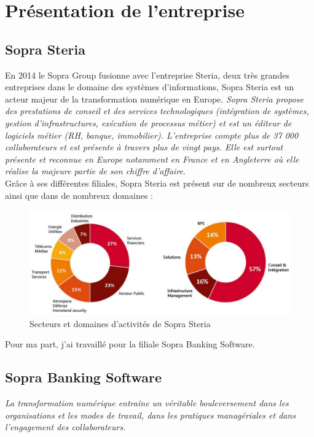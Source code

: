 \section{Présentation de l'entreprise}
\subsection{Sopra Steria}
En 2014 le Sopra Group fusionne avec l'entreprise Steria, deux très grandes entreprises dans le domaine des systèmes d'informations, Sopra Steria est un acteur majeur de la transformation numérique en Europe.
\textit{ Sopra Steria propose des prestations de conseil et des services technologiques (intégration de systèmes, gestion d’infrastructures, exécution de processus métier) et est un éditeur de logiciels métier (RH, banque, immobilier). L'entreprise compte plus de 37 000 collaborateurs et est présente à travers plus de vingt pays. Elle est surtout présente et reconnue en Europe notamment en France et en Angleterre où elle réalise la majeure partie de son chiffre d'affaire}.\\

Grâce à ses différentes filiales, Sopra Steria est présent sur de nombreux secteurs ainsi que dans de nombreux domaines :\\
\begin{figure}[h]
\centering
\includegraphics[scale=0.6]{resources/sopraSteriaGraph.png}
\caption{Secteurs et domaines d'activités de Sopra Steria}
\label{sopraSteriaGraph}
\end{figure}

Pour ma part, j'ai travaillé pour la filiale Sopra Banking Software.

\newpage
\subsection{Sopra Banking Software}
\textit{La transformation numérique entraîne un véritable bouleversement dans les organisations et les modes de travail, dans les pratiques managériales et dans l’engagement des collaborateurs.}\\

